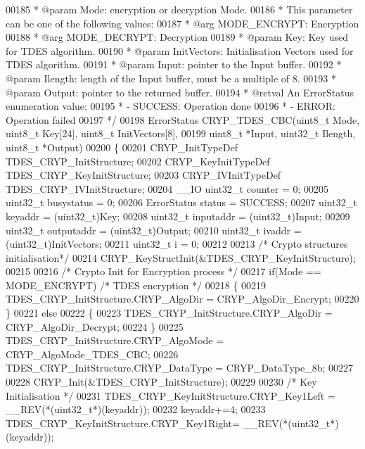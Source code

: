 \begin{DoxyCode}
00185 \textcolor{comment}{  * @param  Mode: encryption or decryption Mode.}
00186 \textcolor{comment}{  *           This parameter can be one of the following values:}
00187 \textcolor{comment}{  *            @arg MODE\_ENCRYPT: Encryption}
00188 \textcolor{comment}{  *            @arg MODE\_DECRYPT: Decryption}
00189 \textcolor{comment}{  * @param  Key: Key used for TDES algorithm.}
00190 \textcolor{comment}{  * @param  InitVectors: Initialisation Vectors used for TDES algorithm.}
00191 \textcolor{comment}{  * @param  Input: pointer to the Input buffer.}
00192 \textcolor{comment}{  * @param  Ilength: length of the Input buffer, must be a multiple of 8.}
00193 \textcolor{comment}{  * @param  Output: pointer to the returned buffer.}
00194 \textcolor{comment}{  * @retval An ErrorStatus enumeration value:}
00195 \textcolor{comment}{  *          - SUCCESS: Operation done}
00196 \textcolor{comment}{  *          - ERROR: Operation failed}
00197 \textcolor{comment}{  */}
00198 ErrorStatus CRYP_TDES_CBC(uint8\_t Mode, uint8\_t Key[24], uint8\_t InitVectors[8],
00199                           uint8\_t *Input, uint32\_t Ilength, uint8\_t *Output)
00200 \{
00201   CRYP\_InitTypeDef TDES\_CRYP\_InitStructure;
00202   CRYP\_KeyInitTypeDef TDES\_CRYP\_KeyInitStructure;
00203   CRYP\_IVInitTypeDef TDES\_CRYP\_IVInitStructure;
00204   \_\_IO uint32\_t counter = 0;
00205   uint32\_t busystatus = 0;
00206   ErrorStatus status = SUCCESS;
00207   uint32\_t keyaddr    = (uint32\_t)Key;
00208   uint32\_t inputaddr  = (uint32\_t)Input;
00209   uint32\_t outputaddr = (uint32\_t)Output;
00210   uint32\_t ivaddr     = (uint32\_t)InitVectors;
00211   uint32\_t i = 0;
00212 
00213   \textcolor{comment}{/* Crypto structures initialisation*/}
00214   CRYP_KeyStructInit(&TDES\_CRYP\_KeyInitStructure);
00215 
00216   \textcolor{comment}{/* Crypto Init for Encryption process */}
00217   \textcolor{keywordflow}{if}(Mode == MODE_ENCRYPT) \textcolor{comment}{/* TDES encryption */}
00218   \{
00219     TDES\_CRYP\_InitStructure.CRYP_AlgoDir = CRYP_AlgoDir_Encrypt;
00220   \}
00221   \textcolor{keywordflow}{else}
00222   \{
00223     TDES\_CRYP\_InitStructure.CRYP_AlgoDir = CRYP_AlgoDir_Decrypt;
00224   \}
00225   TDES\_CRYP\_InitStructure.CRYP_AlgoMode = CRYP_AlgoMode_TDES_CBC;
00226   TDES\_CRYP\_InitStructure.CRYP_DataType = CRYP_DataType_8b;
00227 
00228   CRYP_Init(&TDES\_CRYP\_InitStructure);
00229 
00230   \textcolor{comment}{/* Key Initialisation */}
00231   TDES\_CRYP\_KeyInitStructure.CRYP\_Key1Left = \_\_REV(*(uint32\_t*)(keyaddr));
00232   keyaddr+=4;
00233   TDES\_CRYP\_KeyInitStructure.CRYP\_Key1Right= \_\_REV(*(uint32\_t*)(keyaddr));

\end{DoxyCode}
